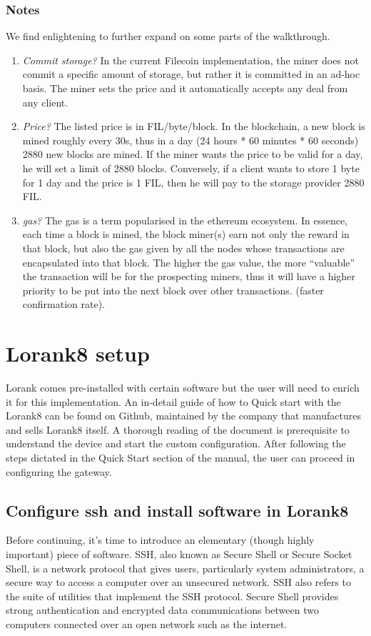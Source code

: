 \subsubsection{Notes}
We find enlightening to further expand on some parts of the walkthrough.
\begin{enumerate}
    \item \textit{Commit storage?} In the current Filecoin implementation, the miner does not commit a specific amount of storage, but rather it is committed in an ad-hoc basis. The miner sets the price and it automatically accepts any deal from any client.
    \item \textit{Price?} The listed price is in FIL/byte/block. In the blockchain, a new block is mined roughly every 30s, thus in a day (24 hours * 60 minutes * 60 seconds) 2880 new blocks are mined. If the miner wants the price to be valid for a day, he will set a limit of 2880 blocks. Conversely, if a client wants to store 1 byte for 1 day and the price is 1 FIL, then he will pay to the storage provider 2880 FIL.
    \item \textit{gas?} The gas is a term popularised in the ethereum ecosystem. In essence, each time a block is mined, the block miner(s) earn not only the reward in that block, but also the gas given by all the nodes whose transactions are encapsulated into that block. The higher the gas value, the more “valuable” the transaction will be for the prospecting miners, thus it will have a higher priority to be put into the next block over other transactions. (faster confirmation rate).
\end{enumerate}

\section{Lorank8 setup}
Lorank comes pre-installed with certain software but the user will need to enrich it for this implementation. An in-detail guide of how to Quick start with the Lorank8 can be found on Github\cite{Lorank8-manual}, maintained by the company that manufactures and sells Lorank8 itself. A thorough reading of the document is prerequisite to understand the device and start the custom configuration. After following the steps dictated in the Quick Start section of the manual, the user can proceed in configuring the gateway.

\subsection{Configure ssh and install software in Lorank8}
Before continuing, it’s time to introduce an elementary (though highly important) piece of software. SSH, also known as Secure Shell or Secure Socket Shell, is a network protocol that gives users, particularly system administrators, a secure way to access a computer over an unsecured network. SSH also refers to the suite of utilities that implement the SSH protocol. Secure Shell provides strong authentication and encrypted data communications between two computers connected over an open network such as the internet.

